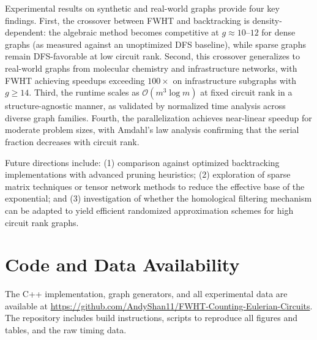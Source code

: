 \documentclass[acmsmall,review]{acmart}
\newcommand{\bigO}{\mathcal{O}}
\begin{document}
	Experimental results on synthetic and real-world graphs provide four key findings. First, the crossover between FWHT and backtracking is density-dependent: the algebraic method becomes competitive at $g \approx 10$--$12$ for dense graphs (as measured against an unoptimized DFS baseline), while sparse graphs remain DFS-favorable at low circuit rank. Second, this crossover generalizes to real-world graphs from molecular chemistry and infrastructure networks, with FWHT achieving speedups exceeding $100\times$ on infrastructure subgraphs with $g \ge 14$. Third, the runtime scales as $\bigO(m^3 \log m)$ at fixed circuit rank in a structure-agnostic manner, as validated by normalized time analysis across diverse graph families. Fourth, the parallelization achieves near-linear speedup for moderate problem sizes, with Amdahl's law analysis confirming that the serial fraction decreases with circuit rank.
	
	Future directions include: (1) comparison against optimized backtracking implementations with advanced pruning heuristics; (2) exploration of sparse matrix techniques or tensor network methods to reduce the effective base of the exponential; and (3) investigation of whether the homological filtering mechanism can be adapted to yield efficient randomized approximation schemes for high circuit rank graphs.
	\section*{Code and Data Availability}
	The C++ implementation, graph generators, and all experimental data are available at \url{https://github.com/AndyShan11/FWHT-Counting-Eulerian-Circuits}. The repository includes build instructions, scripts to reproduce all figures and tables, and the raw timing data.



\end{document}
